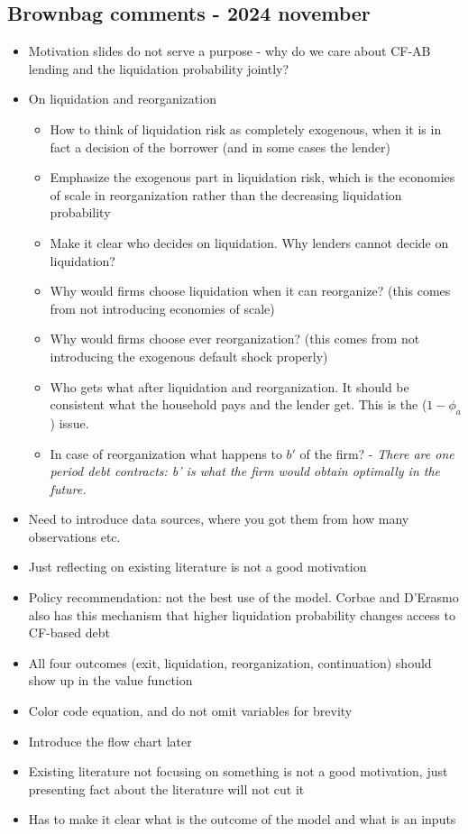 \documentclass[12pt]{article}
\begin{document}
\subsection*{Brownbag comments - 2024 november} 
\begin{itemize} \small
    \item Motivation slides do not serve a purpose - why do we care about CF-AB lending and the liquidation probability jointly?
    \item On liquidation and reorganization
    \begin{itemize}
    \item How to think of liquidation risk as completely exogenous, when it is in fact a decision of the borrower (and in some cases the lender) 
    \item Emphasize the exogenous part in liquidation risk, which is the economies of scale in reorganization rather than the decreasing liquidation probability
    \item Make it clear who decides on liquidation. Why lenders cannot decide on liquidation?
    \item Why would firms choose liquidation when it can reorganize? (this comes from not introducing economies of scale)
    \item Why would firms choose ever reorganization? (this comes from not introducing the exogenous default shock properly)
    \item Who gets what after liquidation and reorganization. It should be consistent what the household pays and the lender get. This is the ($1-\phi_a$) issue. 
    \item In case of reorganization what happens to $b'$ of the firm? - \textit{There are one period debt contracts: b' is what the firm would obtain optimally in the future.} 
\end{itemize}
    \item Need to introduce data sources, where you got them from how many observations etc. 
    \item Just reflecting on existing literature is not a good motivation
    \item Policy recommendation: not the best use of the model. Corbae and D'Erasmo also has this mechanism that higher liquidation probability changes access to CF-based debt
    \item All four outcomes (exit, liquidation, reorganization, continuation) should show up in the value function
    \item Color code equation, and  do not omit variables for brevity
    \item Introduce the flow chart later
    \item Existing literature not focusing on something is not a good motivation, just presenting fact about the literature will not cut it
    \item Has to make it clear what is the outcome of the model and what is an inputs
\end{itemize}
\end{document}

